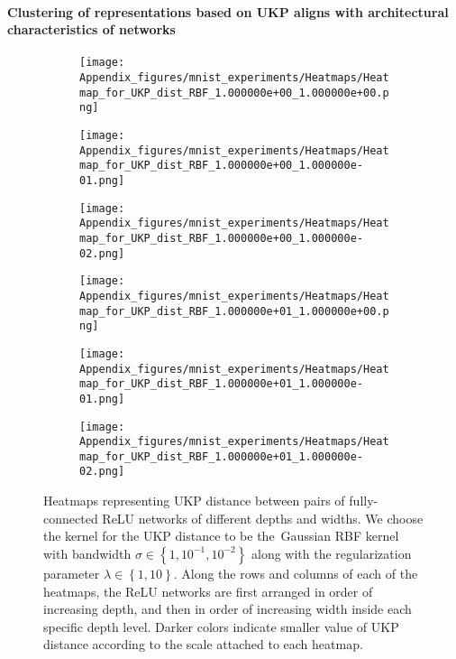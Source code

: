 \documentclass{article} %
\newcommand{\metricstname}{UKP }
\theoremstyle{plain}
\begin{document}
\paragraph{Clustering of representations based on UKP aligns with architectural characteristics of networks}

\begin{figure}[!h]
    \centering
    \begin{subfigure}[b]{0.3\textwidth}
        \texttt{[image: Appendix\_figures/mnist\_experiments/Heatmaps/Heatmap\_for\_UKP\_dist\_RBF\_1.000000e+00\_1.000000e+00.png]}
    \end{subfigure}
    \hfill
    \begin{subfigure}[b]{0.3\textwidth}
        \texttt{[image: Appendix\_figures/mnist\_experiments/Heatmaps/Heatmap\_for\_UKP\_dist\_RBF\_1.000000e+00\_1.000000e-01.png]}
    \end{subfigure}
    \hfill
    \begin{subfigure}[b]{0.3\textwidth}
        \texttt{[image: Appendix\_figures/mnist\_experiments/Heatmaps/Heatmap\_for\_UKP\_dist\_RBF\_1.000000e+00\_1.000000e-02.png]}
    \end{subfigure}
    
    \vspace{0.5cm}  %
    
    \begin{subfigure}[b]{0.3\textwidth}
        \texttt{[image: Appendix\_figures/mnist\_experiments/Heatmaps/Heatmap\_for\_UKP\_dist\_RBF\_1.000000e+01\_1.000000e+00.png]}
    \end{subfigure}
    \hfill
    \begin{subfigure}[b]{0.3\textwidth}
        \texttt{[image: Appendix\_figures/mnist\_experiments/Heatmaps/Heatmap\_for\_UKP\_dist\_RBF\_1.000000e+01\_1.000000e-01.png]}
    \end{subfigure}
    \hfill
    \begin{subfigure}[b]{0.3\textwidth}
        \texttt{[image: Appendix\_figures/mnist\_experiments/Heatmaps/Heatmap\_for\_UKP\_dist\_RBF\_1.000000e+01\_1.000000e-02.png]}
    \end{subfigure}
    
    \caption{Heatmaps representing \metricstname distance between pairs of fully-connected ReLU networks of different depths and widths. We choose the kernel for the \metricstname distance to be the Gaussian RBF kernel with bandwidth $\sigma \in \left\{1,10^{-1},10^{-2}\right\}$ along with the regularization parameter $\lambda \in \left\{1,10\right\}$. Along the rows and columns of each of the heatmaps, the ReLU networks are first arranged in order of increasing depth, and then in order of increasing width inside each specific depth level. Darker colors indicate smaller value of \metricstname distance according to the scale attached to each heatmap.}
    \label{MNIST Heatmaps}
\end{figure}
\end{document}
